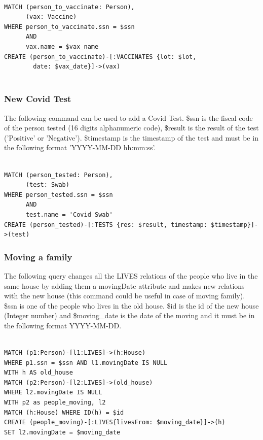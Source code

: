 \documentclass{article}
\begin{document}
\begin{lstlisting}[language=cypher, label=lst:cypher-example]

MATCH (person_to_vaccinate: Person),
      (vax: Vaccine)
WHERE person_to_vaccinate.ssn = $ssn
      AND 
      vax.name = $vax_name
CREATE (person_to_vaccinate)-[:VACCINATES {lot: $lot, 
        date: $vax_date}]->(vax)
        
\end{lstlisting}
\subsubsection{New Covid Test}
The following command can be used to add a Covid Test. \$ssn is the fiscal code of the person tested (16 digits alphanumeric code), \$result is the result of the test ('Positive' or 'Negative'). \$timestamp is the timestamp of the test and must be in the following format 'YYYY-MM-DD hh:mm:ss'.

\begin{lstlisting}[language=cypher, label=lst:cypher-example]

MATCH (person_tested: Person),
      (test: Swab)
WHERE person_tested.ssn = $ssn 
      AND 
      test.name = 'Covid Swab'
CREATE (person_tested)-[:TESTS {res: $result, timestamp: $timestamp}]->(test)

\end{lstlisting}
\subsubsection{Moving a family}
The following query changes all the LIVES relations of the people who live in the same house by adding them a movingDate attribute and makes new relations with the new house (this command could be useful in case of moving family).
\$ssn is one of the people who lives in the old house. \$id is the id of the new house (Integer number) and \$moving\_date is the date of the moving and it must be in the following format YYYY-MM-DD.


\begin{lstlisting}[language=cypher, label=lst:cypher-example]

MATCH (p1:Person)-[l1:LIVES]->(h:House)
WHERE p1.ssn = $ssn AND l1.movingDate IS NULL
WITH h AS old_house
MATCH (p2:Person)-[l2:LIVES]->(old_house)
WHERE l2.movingDate IS NULL
WITH p2 as people_moving, l2
MATCH (h:House) WHERE ID(h) = $id
CREATE (people_moving)-[:LIVES{livesFrom: $moving_date}]->(h)
SET l2.movingDate = $moving_date

\end{lstlisting}
\end{document}
